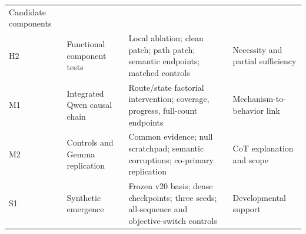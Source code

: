 \documentclass[10pt,twocolumn]{article}
\begin{document}
\begin{center}
\begin{tabularx}{\textwidth}{
  >{\raggedright\arraybackslash}p{}
  >{\raggedright\arraybackslash}p{}
  Y
  >{\raggedright\arraybackslash}p{0.21\textwidth}}
Candidate components \\
H2 & Functional component tests &
Local ablation; clean patch; path patch; semantic endpoints; matched controls &
Necessity and partial sufficiency \\
M1 & Integrated Qwen causal chain &
Route/state factorial intervention; coverage, progress, full-count endpoints &
Mechanism-to-behavior link \\
M2 & Controls and Gemma replication &
Common evidence; null scratchpad; semantic corruptions; co-primary replication &
CoT explanation and scope \\
S1 & Synthetic emergence &
Frozen v20 basis; dense checkpoints; three seeds; all-sequence and objective-switch controls &
Developmental support \\
\bottomrule
\end{tabularx}
\label{tab:todo-ledger}
\end{center}
\end{document}
